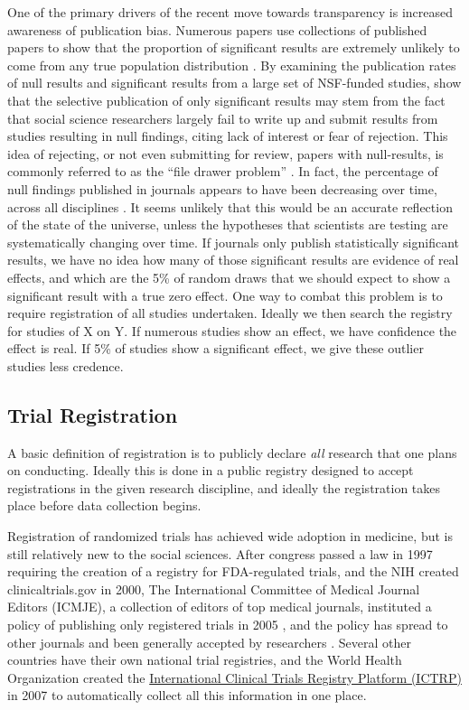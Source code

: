 \documentclass[12pt] {article}
\begin{document}
One of the primary drivers of the recent move towards transparency is
increased awareness of publication bias. Numerous papers use collections
of published papers to show that the proportion of significant results
are extremely unlikely to come from any true population distribution
\citep{delong_are_1992, gerber_testing_2001,  ioannidis_why_2005}. By examining the publication rates of null results and
significant results from a large set of NSF-funded studies, \cite{franco_publication_2014} show that the selective publication of only
significant results may stem from the fact that social science
researchers largely fail to write up and submit results from studies
resulting in null findings, citing lack of interest or fear of
rejection. This idea of rejecting, or not even submitting for review, papers with null-results, is commonly referred to as the ``file drawer problem'' \citep{rosenthal1979file}. In fact, the percentage of null findings published in
journals appears to have been decreasing over time, across all
disciplines \citep{fanelli_negative_2012}. It seems unlikely that this would
be an accurate reflection of the state of the universe, unless the hypotheses that scientists are testing are systematically changing over time. If journals only
publish statistically significant results, we have no idea how many of
those significant results are evidence of real effects, and which are
the 5\% of random draws that we should expect to show a significant
result with a true zero effect. One way to combat this problem is to
require registration of all studies undertaken. Ideally we then search
the registry for studies of X on Y. If numerous studies show an
effect, we have confidence the effect is real. If 5\% of studies show a
significant effect, we give these outlier studies less credence.

\subsection{Trial Registration}\label{trial-registration}

A basic definition of registration is to publicly declare \emph{all}
research that one plans on conducting. Ideally this is done in a public
registry designed to accept registrations in the given research discipline,
and ideally the registration takes place before data collection begins.

Registration of randomized trials has achieved wide adoption in medicine, but is still
relatively new to the social sciences. After congress passed a law in
1997 requiring the creation of a registry for FDA-regulated trials, and
the NIH created clinicaltrials.gov in 2000, The International Committee
of Medical Journal Editors (ICMJE), a collection of editors of top
medical journals, instituted a policy of publishing only registered
trials in 2005 \citep{DeAngelis2004}, and the policy has spread to
other journals and been generally accepted by researchers \citep{laine_clinical_2007}. Several other countries have their own national trial registries, and the World Health Organization created the \href{http://www.who.int/ictrp/about/en/}{International Clinical Trials Registry Platform (ICTRP)} in 2007 to automatically collect all this information in one place.
\end{document}
